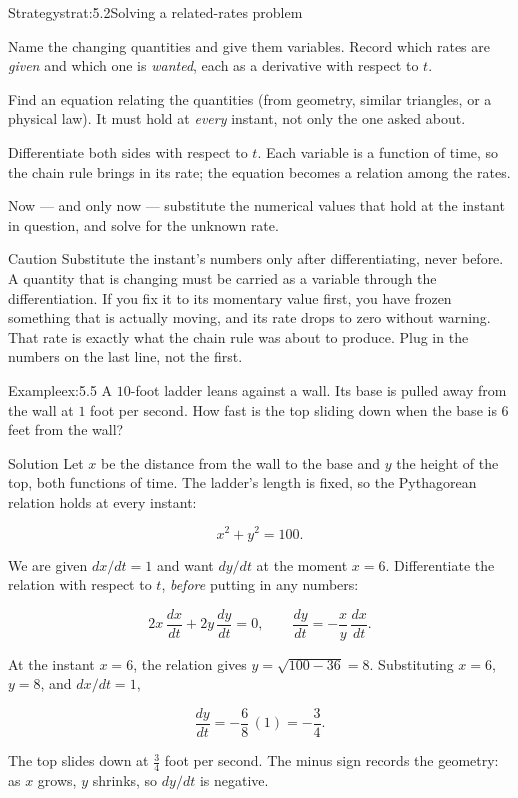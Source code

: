 \documentclass[a4paper,12pt,oneside]{memoir}
\begin{document}
\begin{envstrategy}{Strategy}{strat:5.2}{Solving a related-rates problem}
\begin{steps}
  \item Name the changing quantities and give them variables. Record which rates are \emph{given} and which one is \emph{wanted}, each as a derivative with respect to \(t\).
  \item Find an equation relating the quantities (from geometry, similar triangles, or a physical law). It must hold at \emph{every} instant, not only the one asked about.
  \item Differentiate both sides with respect to \(t\). Each variable is a function of time, so the chain rule brings in its rate; the equation becomes a relation among the rates.
  \item Now — and only now — substitute the numerical values that hold at the instant in question, and solve for the unknown rate.
\end{steps}
\end{envstrategy}
\begin{envcaution}{Caution}{}{}
Substitute the instant’s numbers only after differentiating, never before. A quantity that is changing must be carried as a variable through the differentiation. If you fix it to its momentary value first, you have frozen something that is actually moving, and its rate drops to zero without warning. That rate is exactly what the chain rule was about to produce. Plug in the numbers on the last line, not the first.
\end{envcaution}
\begin{workedexample}
\begin{envexample}{Example}{ex:5.5}{}
A \(10\)-foot ladder leans against a wall. Its base is pulled away from the wall at \(1\) foot per second. How fast is the top sliding down when the base is \(6\) feet from the wall?
\end{envexample}
\begin{envsolution}{Solution}{}{}
Let \(x\) be the distance from the wall to the base and \(y\) the height of the top, both functions of time. The ladder’s length is fixed, so the Pythagorean relation holds at every instant:

\[ x^{2} + y^{2} = 100. \]

We are given \(dx/dt = 1\) and want \(dy/dt\) at the moment \(x = 6\). Differentiate the relation with respect to \(t\), \emph{before} putting in any numbers:

\[ 2x\,\frac{dx}{dt} + 2y\,\frac{dy}{dt} = 0, \qquad \frac{dy}{dt} = -\frac{x}{y}\,\frac{dx}{dt}. \]

At the instant \(x = 6\), the relation gives \(y = \sqrt{100 - 36} = 8\). Substituting \(x = 6\), \(y = 8\), and \(dx/dt = 1\),

\[ \frac{dy}{dt} = -\frac{6}{8}\,(1) = -\frac{3}{4}. \]

The top slides down at \(\tfrac{3}{4}\) foot per second. The minus sign records the geometry: as \(x\) grows, \(y\) shrinks, so \(dy/dt\) is negative. \qedmark
\end{envsolution}
\end{workedexample}
\end{document}
